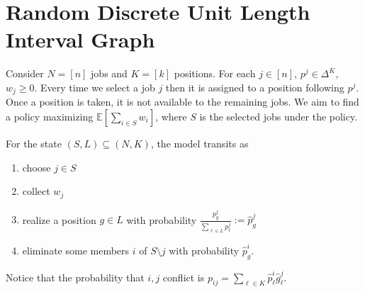 \documentclass{article}
\newcommand{\E}{\mathbb{E}}
\begin{document}
\section{Random Discrete Unit Length Interval Graph}
Consider $N=[n]$ jobs and $K=[k]$ positions.
For each $j\in [n]$, $p^j\in \Delta^K$, $w_j\geq 0$.
Every time we select a job $j$ then it is assigned to a position following $p^j$. 
Once a position is taken, it is not available to the remaining jobs. 
We aim to find a policy maximizing $\E[\sum_{i\in S}w_i]$, where $S$ is the selected jobs under the policy.

For the state $(S,L)\subseteq (N,K)$, the model transits as 
\begin{enumerate}
    \item choose $j\in S$
    \item collect $w_j$
    \item realize a position $g\in L$ with probability \(\frac{p^j_g}{\sum_{\ell\in L}p_\ell^j}:=\hat{p}^j_g\)
    \item eliminate some members $i$ of $S\setminus j$ with probability $\hat{p}^i_g$.
\end{enumerate}
Notice that the probability that $i,j$ conflict is \(p_{ij}=\sum_{\ell\in K}\hat{p}^i_\ell\hat{g}^j_\ell\).
\end{document}
